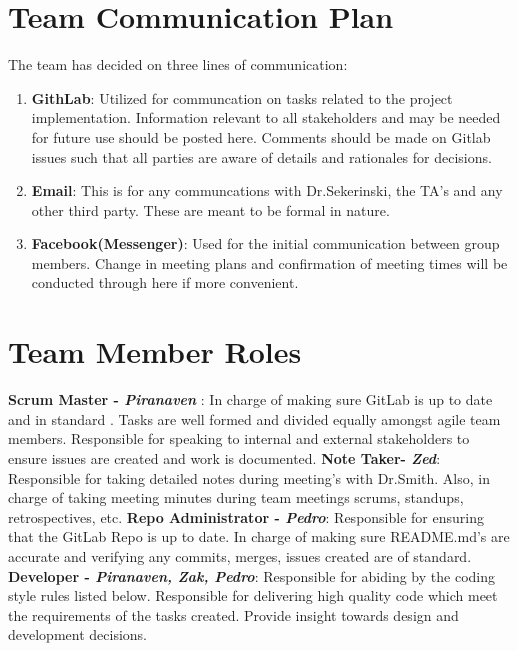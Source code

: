 \documentclass{article}
\begin{document}
\section{Team Communication Plan}

The team has decided on three lines of communication:

\begin{enumerate}
\item \textbf{GithLab}: Utilized for communcation on tasks related to the project implementation. Information relevant to all stakeholders and may be needed for future use should be posted here.  Comments should be made on Gitlab issues such that all parties are aware of details and rationales for decisions.
\item \textbf{Email}: This is for any communcations with Dr.Sekerinski, the TA's and any other third party. These are meant to be formal in nature.
\item \textbf{Facebook(Messenger)}: Used for the initial communication between group members. Change in meeting plans and confirmation of meeting times will be conducted through here if more convenient.
\end{enumerate}

\section{Team Member Roles}

\textbf{Scrum Master -\emph{ Piranaven }}: In charge of making sure GitLab is up to date and in standard . Tasks are well formed and divided equally amongst agile team members. Responsible for  speaking to internal and external stakeholders to ensure issues are created and work is documented. \newline
\textbf{Note Taker- \emph{Zed}}:  Responsible for taking detailed notes during meeting's with Dr.Smith. Also, in charge of taking meeting minutes during team meetings  scrums, standups, retrospectives, etc. \newline
\textbf{Repo Administrator - \emph{ Pedro}}:  Responsible for ensuring that the GitLab Repo is up to date. In charge of making sure README.md's are accurate and verifying any commits, merges, issues created are of standard.   \newline
\textbf{Developer - \emph{ Piranaven, Zak, Pedro}}: Responsible for abiding by the coding style rules listed below. Responsible for delivering high quality code which meet the requirements of the tasks created. Provide insight towards design and development decisions.  \newline
\end{document}
